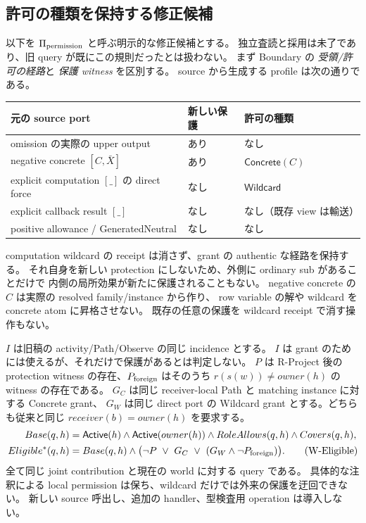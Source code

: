\documentclass[11pt,a4paper]{article}
\newcommand{\Act}{\mathsf{Active}}
\begin{document}
\subsection{許可の種類を保持する修正候補}

以下を \(\Pi_{\rm permission}\) と呼ぶ明示的な修正候補とする。
独立査読と採用は未了であり、旧 query が既にこの規則だったとは扱わない。
まず Boundary の \emph{受領/許可の経路}と \emph{保護 witness} を区別する。
source から生成する profile は次の通りである。

\begin{longtable}{>{\raggedright\arraybackslash}p{}>{\raggedright\arraybackslash}p{}>{\raggedright\arraybackslash}p{}}
\toprule 元の source port & 新しい保護 & 許可の種類 \\
\midrule\endhead
omission の実際の upper output & あり & なし \\
negative concrete \([C,\bar X]\) & あり & \(\mathsf{Concrete}(C)\) \\
explicit computation \([\_]\) の direct force & なし & \(\mathsf{Wildcard}\) \\
explicit callback result \([\_]\) & なし & なし（既存 view は輸送） \\
positive allowance / GeneratedNeutral & なし & なし \\
\bottomrule
\end{longtable}

computation wildcard の receipt は消さず、grant の authentic な経路を保持する。
それ自身を新しい protection にしないため、外側に ordinary sub があることだけで
内側の局所効果が新たに保護されることもない。
negative concrete の \(C\) は実際の resolved family/instance から作り、
row variable の解や wildcard を concrete atom に昇格させない。
既存の任意の保護を wildcard receipt で消す操作もない。

\(I\) は旧稿の activity/Path/Observe の同じ incidence とする。
\(I\) は grant のためには使えるが、それだけで保護があるとは判定しない。
\(P\) は R-Project 後の protection witness の存在、\(P_{\rm foreign}\) はそのうち
\(r(s(w))\ne owner(h)\) の witness の存在である。
\(G_C\) は同じ receiver-local Path と matching instance に対する Concrete grant、
\(G_W\) は同じ direct port の Wildcard grant とする。どちらも従来と同じ
\(receiver(b)=owner(h)\) を要求する。
\begin{align}
 Base(q,h)&=\Act(h)\land\Act(owner(h))\land RoleAllows(q,h)\land Covers(q,h),\notag\\
 Eligible^*(q,h)&=Base(q,h)\land
 \bigl(\neg P\ \lor\ G_C\ \lor\ (G_W\land\neg P_{\rm foreign})\bigr).
\tag{W-Eligible}
\end{align}
全て同じ joint contribution と現在の world に対する query である。
具体的な注釈による local permission は保ち、wildcard だけでは外来の保護を迂回できない。
新しい source 呼出し、追加の handler、型検査用 operation は導入しない。
\end{document}
